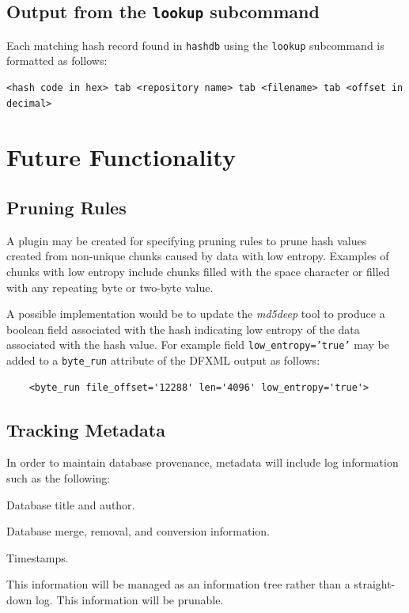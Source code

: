\documentclass[10pt,twoside]{article}
\newcommand{\hdb}{\texttt{hashdb}\xspace}
\newcommand{\mdd}{\emph{md5deep}\xspace}
\begin{document}
\subsection{Output from the \texttt{lookup} subcommand}
Each matching hash record found in \hdb using the \texttt{lookup} subcommand
is formatted as follows:
\begin{small}
\begin{verbatim}
<hash code in hex> tab <repository name> tab <filename> tab <offset in decimal>
\end{verbatim}
\end{small}

\section{Future Functionality}
\subsection{Pruning Rules}
A plugin may be created for specifying pruning rules to prune
hash values created from non-unique chunks caused by data with low entropy.
Examples of chunks with low entropy include
chunks filled with the space character
or filled with any repeating byte or two-byte value.

A possible implementation would be to update the \mdd tool
to produce a boolean field associated with the hash
indicating low entropy of the data associated with the hash value.
For example field \texttt{low\_entropy='true'} may be added
to a \texttt{byte\_run} attribute of the DFXML output as follows:
\begin{small}
\begin{verbatim}
    <byte_run file_offset='12288' len='4096' low_entropy='true'> 
\end{verbatim}
\end{small}

\subsection{Tracking Metadata}
In order to maintain database provenance,
metadata will include log information such as the following:
\begin{compactitem}
\item Database title and author.
\item Database merge, removal, and conversion information.
\item Timestamps.
\end{compactitem}
This information will be managed as an information tree
rather than a straight-down log.
This information will be prunable.
\end{document}
